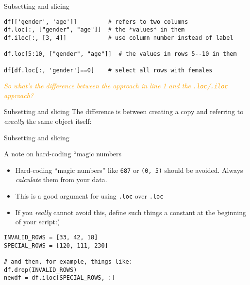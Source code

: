 \begin{frame}[fragile]{Subsetting and slicing}
\begin{verbatim}
df[['gender', 'age']]         # refers to two columns
df.loc[:, ["gender", "age"]]  # the *values* in them
df.iloc[:, [3, 4]]            # use column number instead of label

df.loc[5:10, ["gender", "age"]]  # the values in rows 5--10 in them

df[df.loc[:, 'gender']==0]    # select all rows with females
\end{verbatim}    
\pause

\emph{\textcolor{orange}{So what's the difference between the approach in line 1 and the \texttt{.loc}/\texttt{.iloc} approach?}}
\end{frame}



\begin{frame}{Subsetting and slicing}
  The difference is between creating a copy and referring to \emph{exactly} the same object itself:
\end{frame}








\begin{frame}[fragile]{Subsetting and slicing }
  \begin{block}{A note on hard-coding ``magic numbers}
    \begin{itemize}
    \item Hard-coding ``magic numbers'' like \texttt{687} or \texttt{(0, 5)} should be avoided. Always \emph{calculate} them from your data.
    \item This is a good argument for using \texttt{.loc} over \texttt{.loc}
    \item If you \emph{really} cannot avoid this, define such things a constant at the beginning of your script:)      
    \end{itemize}
  \end{block}

\begin{verbatim}
INVALID_ROWS = [33, 42, 18]
SPECIAL_ROWS = [120, 111, 230]

# and then, for example, things like:
df.drop(INVALID_ROWS)
newdf = df.iloc[SPECIAL_ROWS, :]
\end{verbatim}
  
\end{frame}



